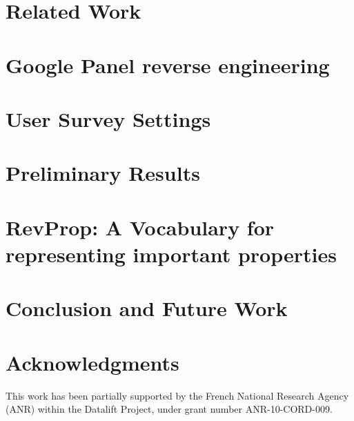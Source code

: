 \documentclass[runningheads,a4paper]{llncs}
\begin{document}
\section{Related Work}
\label{sec:related}




\section{Google Panel reverse engineering}
\label{sec:reverse}


\section{User Survey Settings}
\label{sec:survey}

\section{Preliminary Results}
\label{sec:preli}


\section{RevProp: A Vocabulary for representing important properties }
\label{sec:vocab}


\section{Conclusion and Future Work}
\label{sec:conclusion}


\section*{Acknowledgments} \label{sec:acknowledgments}
This work has been partially supported by the French National Research Agency (ANR) within the Datalift Project, under grant number ANR-10-CORD-009. 


\nocite{*}

\end{document}
